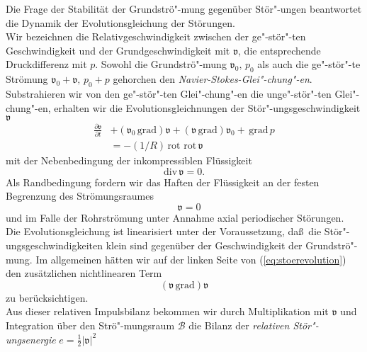 \documentclass[10pt,a5paper,oneside,draft]{book}
\numberwithin{equation}{chapter}
\begin{document}
Die Frage der Stabilit\"at der Grundstr\"o"-mung gegen\"uber St\"or"-ungen beantwortet die Dynamik der Evolutionsgleichung der St\"orungen.\\
Wir bezeichnen die Relativgeschwindigkeit zwischen der ge"-st\"or"-ten Geschwindigkeit und der Grundgeschwindigkeit mit $\mathfrak{v}$, die entsprechende Druckdifferenz mit $p$.
Sowohl die Grundstr\"o"-mung $\mathfrak{v}_0,\,p_0$ als auch die ge"-st\"or"-te Str\"omung $\mathfrak{v}_0 + \mathfrak{v},\,p_0+p$ gehorchen den \textit{Navier-Stokes-Glei"-chung"-en}.
Substrahieren wir von den ge"-st\"or"-ten Glei"-chung"-en die unge"-st\"or"-ten Glei"-chung"-en, erhalten wir die Evolutionsgleichnungen der St\"or"-ungsgeschwindigkeit $\mathfrak{v}$
\begin{equation}\label{eq:stoerevolution}
	\begin{split}
	  \frac{\partial{\mathfrak{v}}}{\partial t} &+ (\mathfrak{v}_0 \,\mathrm{grad}) \mathfrak{v} + (\mathfrak{v} \,\mathrm{grad}) \mathfrak{v}_0 + \,\mathrm{grad}\,p \\
	 	&= - (1/R) \,\mathrm{rot}\,\,\mathrm{rot}\,\mathfrak{v}
	\end{split}
\end{equation}
mit der Nebenbedingung der inkompressiblen Fl\"ussigkeit
\begin{equation}\label{eq:konti}
	\mathrm{div}\,\mathfrak{v} = 0.
\end{equation}
Als Randbedingung fordern wir das Haften der Fl\"ussigkeit an der festen Begrenzung des Str\"omungsraumes
\begin{equation}\label{eq:haft}
	\quad\mathfrak{v} = 0
\end{equation}
und im Falle der Rohrstr\"omung unter Annahme axial periodischer St\"orungen.\\
Die Evolutionsgleichung ist linearisiert unter der Voraussetzung, da\ss\ die St\"or"-ungsgeschwindigkeiten klein sind gegen\"uber der Geschwindigkeit der Grundstr\"o"-mung.
Im allgemeinen h\"atten wir auf der linken Seite von (\mbox{\ref{eq:stoerevolution}}) den zus\"atzlichen nichtlinearen Term 
\begin{equation}
	(\mathfrak{v} \,\mathrm{grad})\mathfrak{v}
\end{equation}
zu ber\"ucksichtigen.\\
Aus dieser relativen Impulsbilanz bekommen wir durch Multiplikation mit $\mathfrak{v}$ und Integration \"uber den Str\"o"-mungsraum $\mathcal{B}$ die Bilanz der \textit{relativen St\"or"-ungsenergie} $e = \frac{1}{2}|\mathfrak{v}|^2$
\end{document}
